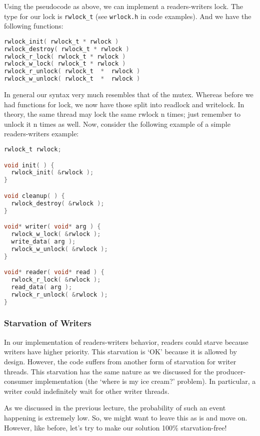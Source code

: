 \newpage

Using the pseudocode as above, we can implement a readers-writers lock.
The type for our lock is \texttt{rwlock\_t} (see \texttt{wrlock.h} in code examples).
And we have the following functions:

	\begin{lstlisting}[language=C]
rwlock_init( rwlock_t * rwlock )
rwlock_destroy( rwlock_t * rwlock )
rwlock_r_lock( rwlock_t * rwlock )
rwlock_w_lock( rwlock_t * rwlock )
rwlock_r_unlock( rwlock_t  *  rwlock )
rwlock_w_unlock( rwlock_t  *  rwlock )
	\end{lstlisting}

	In general our syntax very much resembles that of the mutex.
    Whereas before we had functions for lock, we now have those split into readlock and writelock.
    In theory, the same thread may lock the same rwlock n times; just remember to unlock it n times as well.
    Now, consider the following example of a simple readers-writers example:

	\begin{lstlisting}[language=C]
rwlock_t rwlock;

void init( ) {
  rwlock_init( &rwlock );
}

void cleanup( ) {
  rwlock_destroy( &rwlock );
}

void* writer( void* arg ) {
  rwlock_w_lock( &rwlock );
  write_data( arg );
  rwlock_w_unlock( &rwlock );
}

void* reader( void* read ) {
  rwlock_r_lock( &rwlock );
  read_data( arg );
  rwlock_r_unlock( &rwlock );
}
    \end{lstlisting}


\subsubsection*{Starvation of Writers}

In our implementation of readers-writers behavior, readers could starve because writers have higher priority.
This starvation is `OK' because it is allowed by design.
However, the code suffers from another form of starvation for writer threads.
This starvation has the same nature as we discussed for the producer-consumer implementation (the `where is my ice cream?' problem).
In particular, a writer could indefinitely wait for other writer threads.

As we discussed in the previous lecture, the probability of such an event happening is extremely low.
So, we might want to leave this as is and move on.
However, like before, let's try to make our solution 100\% starvation-free!

